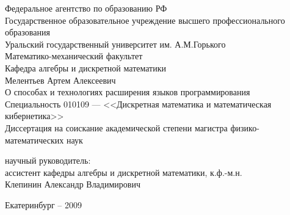 \documentclass[a4paper,12pt,titlepage]{extarticle}
\def \title {О способах и технологиях расширения языков программирования}
\def \author {Мелентьев Артем Алексеевич}
\def \date {Екатеринбург -- 2009}
\def \supergrade {ассистент кафедры алгебры и дискретной математики, к.ф.-м.н.}
\def \super {Клепинин Александр Владимирович}
\def \spec {Специальность 010109 --- <<Дискретная математика и математическая кибернетика>>}
\def \grade {Диссертация на соискание академической степени магистра физико-математических наук}
\begin{document}
\begin{titlepage}\begin{center}
\normalsize
Федеральное агентство по образованию РФ \\
Государственное образовательное учреждение высшего профессионального образования \\
Уральский государственный университет им. А.М.Горького \\
\vfil
Математико-механический факультет \\
Кафедра алгебры и дискретной математики \\ 
\vfil
\large \author\\
\LARGE \title\\
\small \spec\\
\small \grade\\
\vfil
\begin{flushright}
\begin{minipage}[]{250pt}
\normalsize научный руководитель:\\
\normalsize \supergrade\\
\normalsize \super\\
\end{minipage}
\end{flushright}
\vfil
\normalsize \date
\vfilneg
\end{center}\end{titlepage}

\renewcommand{\abstractname}{Реферат}
\begin{abstract}
Мелентьев А.А. ``О способах и технологиях расширения языков программирования'',
квалификационная работа на степень магистра наук: стр.39, рис.4, библ.19.
назв. \newline \newline
Ключевые слова: расширяемый язык программирования, расширение языка, синтаксис,
создание расширений.
\newline \newline
В работе произведено сравнение и классификация различных средств для расширения
как синтаксических, так и семантических возможностей некоторых языков
программирования. Также приведены способы создания таких средств.
\end{abstract}

\setcounter{page}{3}
\renewcommand{\contentsname}{Оглавление}
\tableofcontents

\pagebreak
\end{document}
